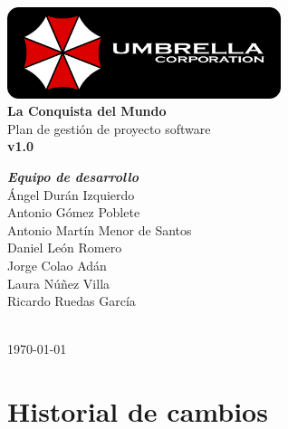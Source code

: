 \documentclass[a4paper,11pt,oneside]{report}
\begin{document}
\renewcommand\listtablename{Índice de tablas}
\renewcommand\tablename{Tabla}

\pagestyle{plain}



\begin{titlepage}
\begin{center}

\includegraphics[width=0.6\textwidth]{logo-umbrella.png}\\[4cm]

{\huge \textbf{La Conquista del Mundo}}\\[0.5cm]
{\huge {Plan de gestión de proyecto software}}\\[0.5cm]
{\Large \textbf{v1.0}}\\[4cm]

\begin{minipage}{0.5\textwidth}
\large
\hspace{1cm}\textbf{\emph{Equipo de desarrollo}}\\
Ángel Durán Izquierdo\\
Antonio Gómez Poblete\\
Antonio Martín Menor de Santos\\
Daniel León Romero\\
Jorge Colao Adán\\
Laura Núñez Villa\\
Ricardo Ruedas García\\
\end{minipage}\\[2cm]

{\Large \today}
\end{center}
\end{titlepage}


\clearpage
{}

\chapter*{Historial de cambios}
\setcounter{page}{2}
\end{document}
